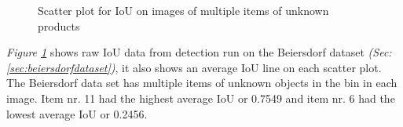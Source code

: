 \begin{figure}[h]
    \centering
    \hfill
    \caption{Scatter plot for IoU on images of multiple items of unknown products}
    \label{figure: v2unknownproducts}
\end{figure}

\textit{Figure \ref{figure: v2unknownproducts}} shows raw IoU data from detection run on the Beiersdorf dataset \textit{(Sec: \ref{sec:beiersdorfdataset})}, it also shows an average IoU line on each scatter plot. The Beiersdorf data set has multiple items of unknown objects in the bin in each image.
Item nr. 11 had the highest average IoU or 0.7549 and item nr. 6 had the lowest average IoU or 0.2456. 

